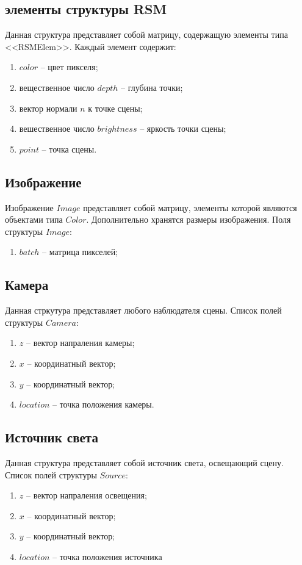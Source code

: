{    \subsection{элементы структуры RSM} {
        Данная структура представляет собой матрицу, содержащую элементы типа <<RSMElem>>.
        Каждый элемент содержит:
        \begin{enumerate}
            \item $color$ -- цвет пикселя;
            \item вещественное число $depth$ -- глубина точки;
            \item вектор нормали $n$ к точке сцены;
            \item вешественное число $brightness$ -- яркость точки сцены;
            \item $point$ -- точка сцены.
        \end{enumerate}
    }
    \subsection{Изображение} {
        Изображение $Image$ представляет собой матрицу, элементы которой
        являются объектами типа $Color$.
        Дополнительно хранятся размеры изображения.
        Поля структуры $Image$:
        \begin{enumerate}
            \item $batch$ -- матрица пикселей;
        \end{enumerate}
    }
    \subsection{Камера} {
        Данная стркутура представляет любого наблюдателя сцены.
        Список полей структуры $Camera$:
        \begin{enumerate}
            \item $z$ -- вектор напраления камеры;
            \item $x$ -- координатный вектор;
            \item $y$ -- координатный вектор;
            \item $location$ -- точка положения камеры.
        \end{enumerate}
    }
    \subsection{Источник света} {
        Данная структура представляет собой источник света, освещающий сцену.
        Список полей структуры $Source$:
        \begin{enumerate}
            \item $z$ -- вектор напраления освещения;
            \item $x$ -- координатный вектор;
            \item $y$ -- координатный вектор;
            \item $location$ -- точка положения источника
        \end{enumerate}
    }
}
